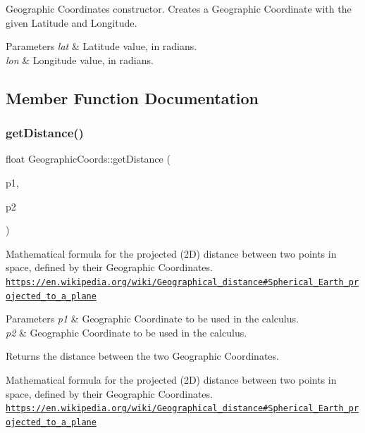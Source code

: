 Geographic Coordinates constructor. Creates a Geographic Coordinate with the given Latitude and Longitude.


\begin{DoxyParams}{Parameters}
{\em lat} & Latitude value, in radians. \\
\hline
{\em lon} & Longitude value, in radians. \\
\hline
\end{DoxyParams}


\subsection{Member Function Documentation}
\hypertarget{class_geographic_coords_a25f3ba7791c305b8620bb0ef8adac156}{}\label{class_geographic_coords_a25f3ba7791c305b8620bb0ef8adac156} 
\subsubsection{\texorpdfstring{get\+Distance()}{getDistance()}}
{\footnotesize\ttfamily float Geographic\+Coords\+::get\+Distance (\begin{DoxyParamCaption}\item[{const \hyperlink{class_geographic_coords}{Geographic\+Coords} \&}]{p1,  }\item[{const \hyperlink{class_geographic_coords}{Geographic\+Coords} \&}]{p2 }\end{DoxyParamCaption})\hspace{0.3cm}{\ttfamily [static]}}

Mathematical formula for the projected (2D) distance between two points in space, defined by their Geographic Coordinates. \href{https://en.wikipedia.org/wiki/Geographical_distance#Spherical_Earth_projected_to_a_plane}{\tt https\+://en.\+wikipedia.\+org/wiki/\+Geographical\+\_\+distance\#\+Spherical\+\_\+\+Earth\+\_\+projected\+\_\+to\+\_\+a\+\_\+plane}


\begin{DoxyParams}{Parameters}
{\em p1} & Geographic Coordinate to be used in the calculus. \\
\hline
{\em p2} & Geographic Coordinate to be used in the calculus.\\
\hline
\end{DoxyParams}
\begin{DoxyReturn}{Returns}
the distance between the two Geographic Coordinates.
\end{DoxyReturn}
Mathematical formula for the projected (2D) distance between two points in space, defined by their Geographic Coordinates. \href{https://en.wikipedia.org/wiki/Geographical_distance#Spherical_Earth_projected_to_a_plane}{\tt https\+://en.\+wikipedia.\+org/wiki/\+Geographical\+\_\+distance\#\+Spherical\+\_\+\+Earth\+\_\+projected\+\_\+to\+\_\+a\+\_\+plane} \hypertarget{class_geographic_coords_ab2fa1d7cde50be2a00c297caa302297a}{}\label{class_geographic_coords_ab2fa1d7cde50be2a00c297caa302297a} 
